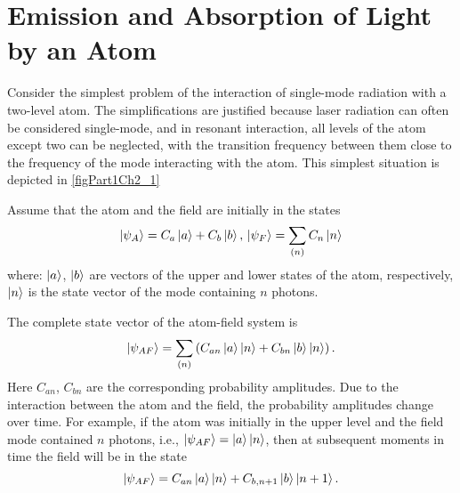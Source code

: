 \section{Emission and Absorption of Light by an Atom}
Consider the simplest problem of the interaction of single-mode radiation with a two-level atom. The simplifications are justified because laser radiation can often be considered single-mode, and in resonant interaction, all levels of the atom except two can be neglected, with the transition frequency between them close to the frequency of the mode interacting with the atom. This simplest situation is depicted in \autoref{figPart1Ch2_1}



Assume that the atom and the field are initially in the states
\begin{equation}
\left|\psi_A\right> = C_a\ket{a} + C_b\ket{b}, \,
\left|\psi_F\right> = \sum_{(n)}C_n\ket{n}
\end{equation}
where: $\ket{a}$, $\ket{b}$ are vectors of the upper and lower states of the atom, respectively, $\ket{n}$ is the state vector of the mode containing $n$ photons.

The complete state vector of the atom-field system is
\begin{equation}
\left|\psi_{AF}\right> = \sum_{(n)} 
\left(
C_{an}\ket{a}\ket{n} + 
C_{bn}\ket{b}\ket{n}
\right).
\end{equation}
Here $C_{an}$, $C_{bn}$ are the corresponding probability amplitudes. Due to the interaction between the atom and the field, the probability amplitudes change over time. For example, if the atom was initially in the upper level and the field mode contained $n$ photons, i.e.,
$\left|\psi_{AF}\right> = \ket{a}\ket{n}$,
then at subsequent moments in time the field will be in the state
\begin{equation}
\left|\psi_{AF}\right> =
C_{an}\ket{a}\ket{n} + 
C_{b,n + 1}\ket{b}\ket{n + 1}.
\label{eq:part1:rabi_solution}
\end{equation}